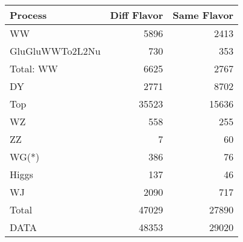 \begin{table}[ht]
	\centering
\begin{tabular}{lrr}

         Process &  Diff Flavor &  Same Flavor \\
		\hline
              WW &         5896 &         2413 \\
 GluGluWWTo2L2Nu &          730 &          353 \\
\hline
       Total: WW &         6625 &         2767 \\
              DY &         2771 &         8702 \\
             Top &        35523 &        15636 \\
              WZ &          558 &          255 \\
              ZZ &            7 &           60 \\
           WG(*) &          386 &           76 \\
           Higgs &          137 &           46 \\
              WJ &         2090 &          717 \\
\hline
           Total &        47029 &        27890 \\
            DATA &        48353 &        29020 \\


\end{tabular}

\end{table}